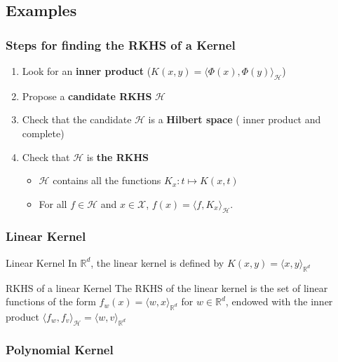 \documentclass{article}
\begin{document}
\subsection{Examples}

\subsubsection{Steps for finding the RKHS of a Kernel}
\begin{enumerate}
  \item Look for an \textbf{inner product} ($K(x, y) = \langle \Phi(x), \Phi(y)
  \rangle_\mathcal{H}$)
  \item Propose a \textbf{candidate RKHS} $\mathcal{H}$
  \item Check that the candidate $\mathcal{H}$ is a \textbf{Hilbert space} (
  inner product and complete)
  \item Check that $\mathcal{H}$ is \textbf{the RKHS}
  \begin{itemize}
    \item $\mathcal{H}$ contains all the functions $K_x : t \mapsto K(x,t)$
    \item For all $f \in \mathcal{H}$ and $x\in \mathcal{X}$, $f(x) = \langle
    f, K_x \rangle_\mathcal{H}$.
  \end{itemize}
\end{enumerate}

\subsubsection{Linear Kernel}

\begin{Definition}{Linear Kernel}{}
  In $\mathbb{R}^d$, the linear kernel is defined by $K(x, y) = \langle x, y 
  \rangle_{\mathbb{R}^d}$
\end{Definition}

\begin{Theorem}{RKHS of a linear Kernel}{}
  The RKHS of the linear kernel is the set of linear functions of the form 
  $f_w(x) = \langle w,x \rangle_{\mathbb{R}^d}$ for $w \in \mathbb{R}^d$,
  endowed with the inner product $\langle f_w,f_v \rangle_\mathcal{H} = 
  \langle w,v \rangle_{\mathbb{R}^d}$
\end{Theorem}

\subsubsection{Polynomial Kernel}
\end{document}
